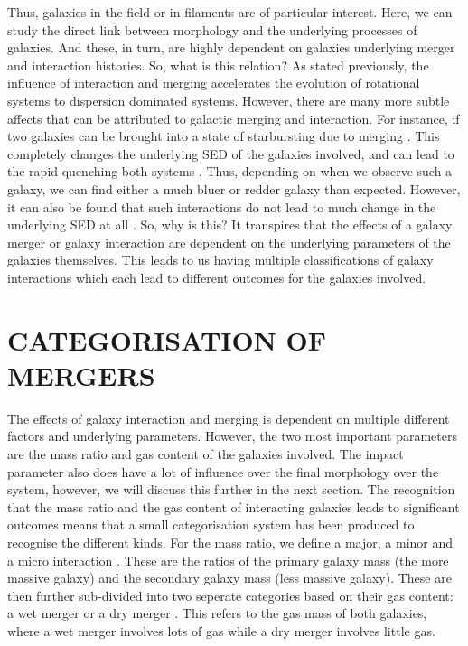 Thus, galaxies in the field or in filaments are of particular interest. Here, we can study the direct link between morphology and the underlying processes of galaxies. And these, in turn, are highly dependent on galaxies underlying merger and interaction histories. So, what is this relation? As stated previously, the influence of interaction and merging accelerates the evolution of rotational systems to dispersion dominated systems. However, there are many more subtle affects that can be attributed to galactic merging and interaction. For instance, if two galaxies can be brought into a state of starbursting due to merging \citep{Paper on starbursting galaxies in interaction.}. This completely changes the underlying SED of the galaxies involved, and can lead to the rapid quenching both systems \citep{Paper on quenching a galaxy with interaction}. Thus, depending on when we observe such a galaxy, we can find either a much bluer or redder galaxy than expected. However, it can also be found that such interactions do not lead to much change in the underlying SED at all \citep{Paper on not much change in the SED of a galaxy}. So, why is this? It transpires that the effects of a galaxy merger or galaxy interaction are dependent on the underlying parameters of the galaxies themselves. This leads to us having multiple classifications of galaxy interactions which each lead to different outcomes for the galaxies involved. 

\section{CATEGORISATION OF MERGERS}
\noindent The effects of galaxy interaction and merging is dependent on multiple different factors and underlying parameters. However, the two most important parameters are the mass ratio \citep{paper saying mass ratio is important} and gas content \citep{paper that says the gas content is important} of the galaxies involved. The impact parameter also does have a lot of influence over the final morphology over the system, however, we will discuss this further in the next section. The recognition that the mass ratio and the gas content of interacting galaxies leads to significant outcomes means that a small categorisation system has been produced to recognise the different kinds. For the mass ratio, we define a major, a minor and a micro interaction \citep{Paper with these definitions in them?}. These are the ratios of the primary galaxy mass (the more massive galaxy) and the secondary galaxy mass (less massive galaxy). These are then further sub-divided into two seperate categories based on their gas content: a wet merger or a dry merger \citep{Paper on wet vs dry mergers}. This refers to the gas mass of both galaxies, where a wet merger involves lots of gas while a dry merger involves little gas.

